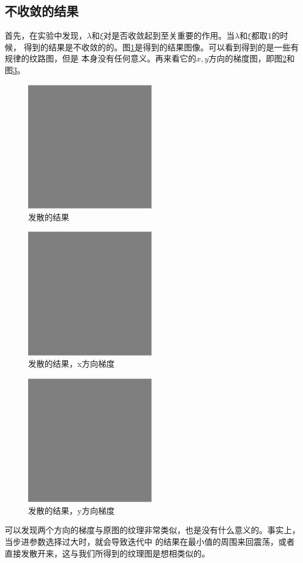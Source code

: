 \subsection{不收敛的结果}
首先，在实验中发现，$\lambda$和$\xi$对是否收敛起到至关重要的作用。当$\lambda$和$\xi$都取$1$的时候，
得到的结果是不收敛的的。图\ref{fig:Iout1}是得到的结果图像。可以看到得到的是一些有规律的纹路图，但是
本身没有任何意义。再来看它的$x,y$方向的梯度图，即图\ref{fig:Ioutx1}和图\ref{fig:Iouty1}。
\begin{figure}[h!]
\center
\includegraphics[width=0.5\textwidth]{figure/gradtest/Iout1}
\caption{发散的结果}\label{fig:Iout1}
\end{figure}
\begin{figure}[h!]
\center
\includegraphics[width=0.5\textwidth]{figure/gradtest/Ioutx1}
\caption{发散的结果，x方向梯度}\label{fig:Ioutx1}
\end{figure}
\begin{figure}[h!]
\center
\includegraphics[width=0.5\textwidth]{figure/gradtest/Iouty1}
\caption{发散的结果，y方向梯度}\label{fig:Iouty1}
\end{figure}
可以发现两个方向的梯度与原图的纹理非常类似，也是没有什么意义的。事实上，当步进参数选择过大时，就会导致迭代中
的结果在最小值的周围来回震荡，或者直接发散开来，这与我们所得到的纹理图是想相类似的。
\FloatBarrier
